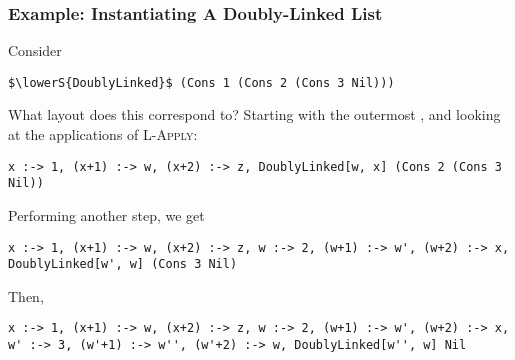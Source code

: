\documentclass[10pt]{article}
\begin{document}
%
%
%
%
%
%

\subsubsection{Example: Instantiating A Doubly-Linked List}

Consider

\begin{lstlisting}
$\lowerS{DoublyLinked}$ (Cons 1 (Cons 2 (Cons 3 Nil)))
\end{lstlisting}

What layout does this correspond to? Starting with the outermost , and looking
at the applications of \textsc{L-Apply}:

\begin{lstlisting}
x :-> 1, (x+1) :-> w, (x+2) :-> z, DoublyLinked[w, x] (Cons 2 (Cons 3 Nil))
\end{lstlisting}

Performing another step, we get

\begin{lstlisting}
x :-> 1, (x+1) :-> w, (x+2) :-> z, w :-> 2, (w+1) :-> w', (w+2) :-> x, DoublyLinked[w', w] (Cons 3 Nil)
\end{lstlisting}

Then,

\begin{lstlisting}
x :-> 1, (x+1) :-> w, (x+2) :-> z, w :-> 2, (w+1) :-> w', (w+2) :-> x, w' :-> 3, (w'+1) :-> w'', (w'+2) :-> w, DoublyLinked[w'', w] Nil
\end{lstlisting}
\end{document}
